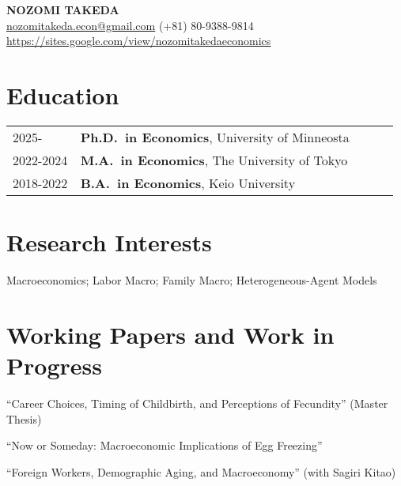 \documentclass[11pt]{article}
\begin{document}
\begin{center}
    {\LARGE \bfseries NOZOMI TAKEDA}\\[4pt]
    \href{mailto:nozomitakeda.econ@gmail.com}{nozomitakeda.econ@gmail.com} (+81) 80-9388-9814\\
    \url{https://sites.google.com/view/nozomitakedaeconomics}
\end{center}
\vspace{4pt}

\section*{Education}
\begin{tabular}{p{0.17\linewidth} p{0.80\linewidth}}
2025-            & \textbf{Ph.D.\ in Economics}, University of Minneosta\\[2pt]
2022-2024        & \textbf{M.A.\ in Economics}, The University of Tokyo\\[2pt]
2018-2022        & \textbf{B.A.\ in Economics}, Keio University\\
\end{tabular}

\section*{Research Interests}
Macroeconomics; Labor Macro; Family Macro; Heterogeneous-Agent Models

\section*{Working Papers and Work in Progress}
\begin{enumerate}[label={[\arabic*]}, leftmargin=*]
    \item ``Career Choices, Timing of Childbirth, and Perceptions of Fecundity'' (Master Thesis)
    \item ``Now or Someday: Macroeconomic Implications of Egg Freezing''
    \item ``Foreign Workers, Demographic Aging, and Macroeconomy'' (with Sagiri Kitao)
\end{enumerate}

\end{document}
